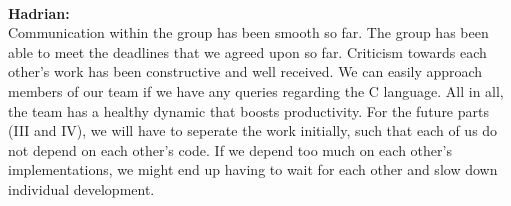 \documentclass[a4paper]{article}
\begin{document}
\\
\textbf{Hadrian:}\\
Communication within the group has been smooth so far. The group has been able to meet the deadlines that we agreed upon so far. Criticism towards each other's work has been constructive and well received. We can easily approach members of our team if we have any queries regarding the C language. All in all, the team has a healthy dynamic that boosts productivity. For the future parts (III and IV), we will have to seperate the work initially, such that each of us do not depend on each other's code. If we depend too much on each other's implementations, we might end up having to wait for each other and slow down individual development.
\end{document}
